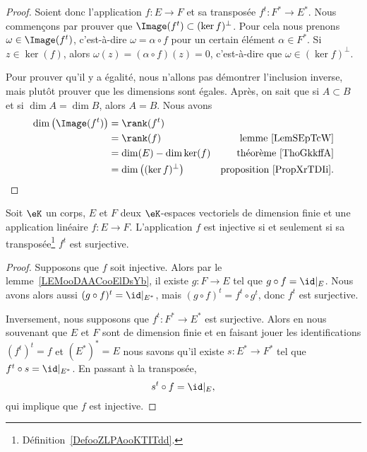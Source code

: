 \begin{proof}
	Soient donc l'application \( f\colon E\to F\) et sa transposée \( f^t\colon F^*\to E^*\). Nous commençons par prouver que \( \Image(f^{t})\subset(\ker f)^{\perp}\). Pour cela nous prenons \( \omega\in \Image(f^t)\), c'est-à-dire \( \omega=\alpha\circ f\) pour un certain élément \( \alpha\in F^*\). Si \( z\in\ker(f)\), alors \( \omega(z)=(\alpha\circ f)(z)=0\), c'est-à-dire que \( \omega\in (\ker f)^{\perp}\).

	Pour prouver qu'il y a égalité, nous n'allons pas démontrer l'inclusion inverse, mais plutôt prouver que les dimensions sont égales. Après, on sait que si \( A\subset B\) et si \( \dim A=\dim B\), alors \( A=B\). Nous avons
	\begin{subequations}
		\begin{align}
			\dim\big( \Image(f^t) \big) & =\rank(f^t)                                                              \\
			                            & =\rank(f)                         & \text{lemme~\ref{LemSEpTcW}}         \\
			                            & =\dim(E)-\dim\ker(f)              & \text{théorème~\ref{ThoGkkffA}}      \\
			                            & =\dim\big( (\ker f)^{\perp} \big) & \text{proposition~\ref{PropXrTDIi}}.
		\end{align}
	\end{subequations}
\end{proof}

\begin{lemma}
	Soit \( \eK\) un corps, \( E\) et \( F\) deux \( \eK\)-espaces vectoriels de dimension finie et une application linéaire \( f\colon E\to F\). L'application \( f\) est injective si et seulement si sa transposée\footnote{Définition~\ref{DefooZLPAooKTITdd}.} \( f^t\) est surjective.
\end{lemma}

\begin{proof}
	Supposons que \( f\) soit injective. Alors par le lemme~\ref{LEMooDAACooElDsYb}, il existe \( g\colon F\to E\) tel que \( g\circ f=\id|_E\). Nous avons alors aussi \( (g\circ f)^t=\id|_{E^*}\), mais \( (g\circ f)^t=f^t\circ g^t\), donc \( f^t\) est surjective.

	Inversement, nous supposons que \( f^t\colon F^*\to E^*\) est surjective. Alors en nous souvenant que \( E\) et \( F\) sont de dimension finie et en faisant jouer les identifications \( (f^t)^t=f\) et \( (E^*)^*=E\) nous savons qu'il existe \( s\colon E^*\to F^*\) tel que \( f^t\circ s=\id|_{E^*}\). En passant à la transposée,
	\begin{equation}
		s^t\circ f=\id|_{E},
	\end{equation}
	qui implique que \( f\) est injective.
\end{proof}

